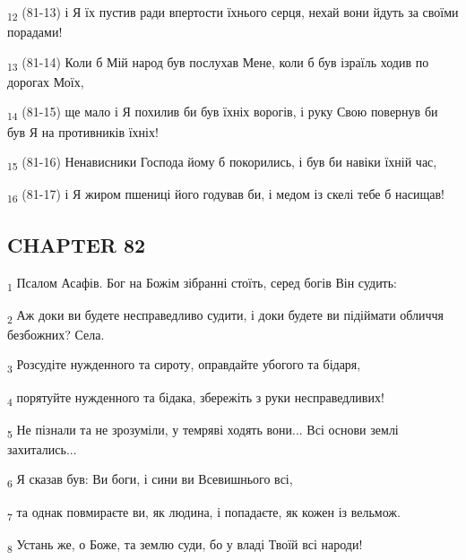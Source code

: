 \begin{tcolorbox}
\textsubscript{12} (81-13) і Я їх пустив ради впертости їхнього серця, нехай вони йдуть за своїми порадами!
\end{tcolorbox}
\begin{tcolorbox}
\textsubscript{13} (81-14) Коли б Мій народ був послухав Мене, коли б був ізраїль ходив по дорогах Моїх,
\end{tcolorbox}
\begin{tcolorbox}
\textsubscript{14} (81-15) ще мало і Я похилив би був їхніх ворогів, і руку Свою повернув би був Я на противників їхніх!
\end{tcolorbox}
\begin{tcolorbox}
\textsubscript{15} (81-16) Ненависники Господа йому б покорились, і був би навіки їхній час,
\end{tcolorbox}
\begin{tcolorbox}
\textsubscript{16} (81-17) і Я жиром пшениці його годував би, і медом із скелі тебе б насищав!
\end{tcolorbox}
\subsection{CHAPTER 82}
\begin{tcolorbox}
\textsubscript{1} Псалом Асафів. Бог на Божім зібранні стоїть, серед богів Він судить:
\end{tcolorbox}
\begin{tcolorbox}
\textsubscript{2} Аж доки ви будете несправедливо судити, і доки будете ви підіймати обличчя безбожних? Села.
\end{tcolorbox}
\begin{tcolorbox}
\textsubscript{3} Розсудіте нужденного та сироту, оправдайте убогого та бідаря,
\end{tcolorbox}
\begin{tcolorbox}
\textsubscript{4} порятуйте нужденного та бідака, збережіть з руки несправедливих!
\end{tcolorbox}
\begin{tcolorbox}
\textsubscript{5} Не пізнали та не зрозуміли, у темряві ходять вони... Всі основи землі захитались...
\end{tcolorbox}
\begin{tcolorbox}
\textsubscript{6} Я сказав був: Ви боги, і сини ви Всевишнього всі,
\end{tcolorbox}
\begin{tcolorbox}
\textsubscript{7} та однак повмираєте ви, як людина, і попадаєте, як кожен із вельмож.
\end{tcolorbox}
\begin{tcolorbox}
\textsubscript{8} Устань же, о Боже, та землю суди, бо у владі Твоїй всі народи!
\end{tcolorbox}
